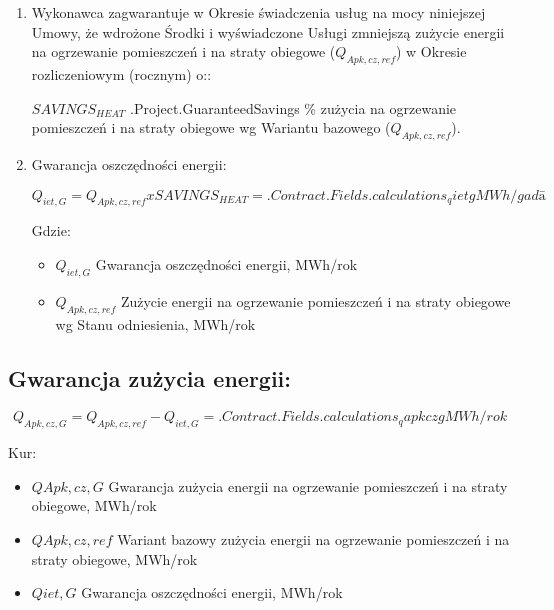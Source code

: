 \begin{enumerate}
	\item Wykonawca zagwarantuje w Okresie świadczenia usług na mocy niniejszej Umowy, że wdrożone Środki i wyświadczone Usługi zmniejszą zużycie energii na ogrzewanie pomieszczeń i na straty obiegowe ($Q_{Apk,cz,ref}$) w Okresie rozliczeniowym (rocznym) o::

	$SAVINGS_{HEAT}$ \iffalse input project.savings value="{{.Project.GuaranteedSavings}}" type="number" \fi {{.Project.GuaranteedSavings}} \% zużycia na ogrzewanie pomieszczeń i na straty obiegowe wg Wariantu bazowego ($Q_{Apk,cz,ref}$).

	\item Gwarancja oszczędności energii:

\[Q_{iet,G} = Q_{Apk, cz, ref} x SAVINGS_{HEAT}  = {{.Contract.Fields.calculations_qietg}} MWh/gadā\]

Gdzie:
\begin{itemize}
	\item $Q_{iet,G}$	Gwarancja oszczędności energii, MWh/rok
	\item $Q_{Apk,cz,ref}$	Zużycie energii na ogrzewanie pomieszczeń i na straty obiegowe wg Stanu odniesienia, MWh/rok
\end{itemize}

\end{enumerate}

\subsection{Gwarancja zużycia energii:}

\[Q_{Apk,cz,G} = Q_{Apk,cz,ref} - Q_{iet,G} = {{.Contract.Fields.calculations_qapkczg}} MWh/rok\]

Kur:

\begin{itemize}
	\item $QApk,cz,G$	Gwarancja zużycia energii na ogrzewanie pomieszczeń i na straty obiegowe, MWh/rok
	\item $QApk,cz,ref$	Wariant bazowy zużycia energii na ogrzewanie pomieszczeń i na straty obiegowe, MWh/rok
	\item $Qiet,G$	Gwarancja oszczędności energii, MWh/rok
\end{itemize}
